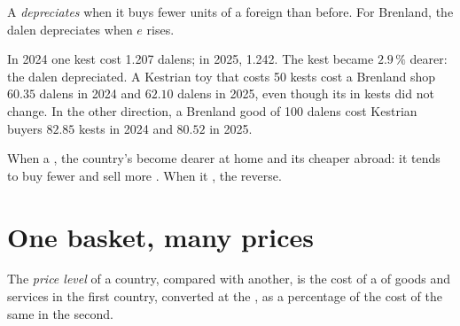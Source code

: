 \begin{definition}\label{def:g9:exchange-rates-and-purchasing-power:depreciation}
A  \emph{depreciates} when it buys fewer units of a foreign
 than before. For Brenland, the dalen depreciates when $e$ rises.
\end{definition}

In 2024 one kest cost 1.207 dalens; in 2025, 1.242. The kest became $2.9\,\%$ dearer: the dalen
depreciated. A Kestrian toy that costs 50 kests cost a Brenland shop $60.35$ dalens in 2024 and $62.10$
dalens in 2025, even though its  in kests did not change. In the other direction, a Brenland good of
100 dalens cost Kestrian buyers $82.85$ kests in 2024 and $80.52$ in 2025.

When a  , the country's  become dearer at home and its  cheaper abroad:
it tends to buy fewer  and sell more . When it , the reverse.

\section{One basket, many prices}

\begin{definition}\label{def:g9:exchange-rates-and-purchasing-power:price-level}
The \emph{price level} of a country, compared with another, is the cost
of a  of goods and services in the first country, converted at the  , as a
percentage of the cost of the same  in the second.
\end{definition}

